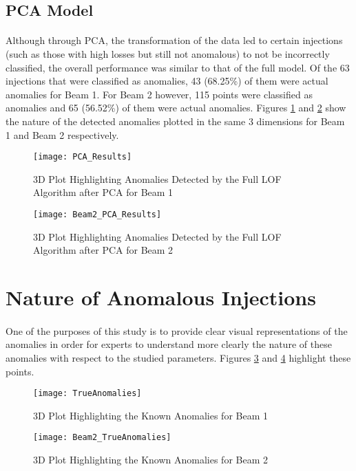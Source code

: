 \subsection{PCA Model}
\paragraph{ }Although through \acs{PCA}, the transformation of the data led to certain injections (such as those with high losses but still not anomalous) to not be incorrectly classified, the overall performance was similar to that of the full model. Of the 63 injections that were classified as anomalies, 43 (68.25\%) of them were actual anomalies for Beam 1. For Beam 2 however, 115 points were classified as anomalies and 65 (56.52\%) of them were actual anomalies. Figures \ref{fig::PCA_results1} and \ref{fig::PCA_results2} show the nature of the detected anomalies plotted in the same 3 dimensions for Beam 1 and Beam 2 respectively.


\begin{figure}[H]
	\centering
	\texttt{[image: PCA\_Results]}
	\caption[PCA Dataset Results Beam 1]{3D Plot Highlighting Anomalies Detected by the Full LOF Algorithm after PCA for Beam 1}
	\label{fig::PCA_results1}
\end{figure}

\begin{figure}[H]
	\centering
	\texttt{[image: Beam2\_PCA\_Results]}
	\caption[PCA Dataset Results Beam 2]{3D Plot Highlighting Anomalies Detected by the Full LOF Algorithm after PCA for Beam 2}
	\label{fig::PCA_results2}
\end{figure} 

\section{Nature of Anomalous Injections}
\paragraph{ }One of the purposes of this study is to provide clear visual representations of the anomalies in order for experts to understand more clearly the nature of these anomalies with respect to the studied parameters. Figures \ref{fig::TrueAnomalies} and \ref{fig::TrueAnomalies2} highlight these points.

\begin{figure}[H]
	\centering
	\texttt{[image: TrueAnomalies]}
	\caption[True Anomalous Injections (Beam 1)]{3D Plot Highlighting the Known Anomalies for Beam 1}
	\label{fig::TrueAnomalies}
\end{figure}

\begin{figure}[H]
	\centering
	\texttt{[image: Beam2\_TrueAnomalies]}
	\caption[True Anomalous Injections (Beam 2)]{3D Plot Highlighting the Known Anomalies for  Beam 2}
	\label{fig::TrueAnomalies2}
\end{figure} 
